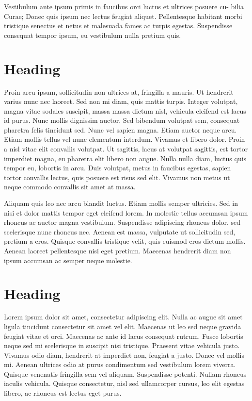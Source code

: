 \documentclass[10pt,a4paper]{article}
\begin{document}
\begin{multicols}{2}
Vestibulum ante ipsum primis in faucibus orci luctus et ultrices posuere cu- bilia Curae; Donec quis ipsum nec lectus feugiat aliquet. Pellentesque habitant morbi tristique senectus et netus et malesuada fames ac turpis egestas. Suspendisse consequat tempor ipsum, eu vestibulum nulla pretium quis.

\section{Heading}
Proin arcu ipsum, sollicitudin non ultrices at, fringilla a mauris. Ut hendrerit varius nunc nec laoreet. Sed non mi diam, quis mattis turpis. Integer volutpat, magna vitae sodales suscipit, massa massa dictum nisl, vehicula eleifend est lacus id purus. Nunc mollis dignissim auctor. Sed bibendum volutpat sem, consequat pharetra felis tincidunt sed. Nunc vel sapien magna. Etiam auctor neque arcu. Etiam mollis tellus vel nunc elementum interdum. Vivamus et libero dolor. Proin a nisl vitae elit convallis volutpat. Ut sagittis, lacus at volutpat sagittis, est tortor imperdiet magna, eu pharetra elit libero non augue. Nulla nulla diam, luctus quis tempor eu, lobortis in arcu. Duis volutpat, metus in faucibus egestas, sapien tortor convallis lectus, quis posuere est risus sed elit. Vivamus non metus ut neque commodo convallis sit amet at massa.

Aliquam quis leo nec arcu blandit luctus. Etiam mollis semper ultricies. Sed in nisi et dolor mattis tempor eget eleifend lorem. In molestie tellus accumsan ipsum rhoncus ac auctor magna vestibulum. Suspendisse adipiscing rhoncus dolor, sed scelerisque nunc rhoncus nec. Aenean est massa, vulputate ut sollicitudin sed, pretium a eros. Quisque convallis tristique velit, quis euismod eros dictum mollis. Aenean laoreet pellentesque nisi eget pretium. Maecenas hendrerit diam non ipsum accumsan ac semper neque molestie. \cite{Elovitz:1976} \cite{Damper:1997}

\section{Heading}
Lorem ipsum dolor sit amet, consectetur adipiscing elit. Nulla ac augue sit amet ligula tincidunt consectetur sit amet vel elit. Maecenas ut leo sed neque gravida feugiat vitae et orci. Maecenas ac ante id lacus consequat rutrum. Fusce lobortis neque sed mi scelerisque in suscipit nisi tristique. Praesent vitae vehicula justo. Vivamus odio diam, hendrerit at imperdiet non, feugiat a justo. Donec vel mollis mi. Aenean ultrices odio at purus condimentum sed vestibulum lorem viverra. Quisque venenatis fringilla sem vel aliquam. Suspendisse potenti. Nullam rhoncus iaculis vehicula. Quisque consectetur, nisl sed ullamcorper cursus, leo elit egestas libero, ac rhoncus est lectus eget purus.


\end{multicols}
\end{document}
